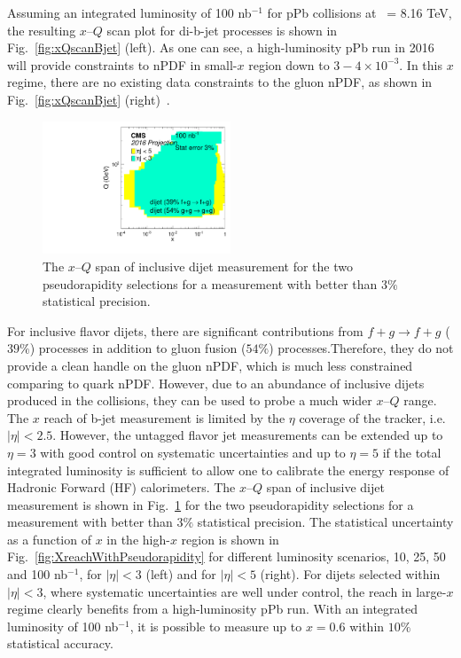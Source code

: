 Assuming an integrated luminosity of 100 nb$^{-1}$ for pPb collisions
at \rootsNN\ = 8.16 TeV, the resulting $x$--$Q$ scan plot for di-b-jet processes 
is shown in Fig.~\ref{fig:xQscanBjet} (left). As one can see, a high-luminosity
pPb run in 2016 will provide constraints to nPDF in small-$x$ region down to
$3-4 \times 10^{-3}$. In this $x$ regime, there are no existing data
constraints to the gluon nPDF, as shown in Fig.~\ref{fig:xQscanBjet} (right)~\cite{Paukkunen:2014nqa}.

\begin{figure}[h]
\begin{center}
\includegraphics[width= 0.5\textwidth]{figures/filledQX_Lumi100_InclusiveJet_etaComparison.pdf}
\caption{The $x$--$Q$ span of inclusive dijet measurement for the two pseudorapidity selections 
for a measurement with better than $3\%$ statistical precision. }
\label{fig:xQscanInclusive}
\end{center}
\end{figure}


For inclusive flavor dijets, there are significant contributions
from $f + g \rightarrow f + g$ ($39 \%$) processes in addition to gluon fusion 
($54 \%$) processes.Therefore, they do not provide a clean handle on 
the gluon nPDF, which is much less constrained comparing to quark nPDF.
However, due to an abundance of inclusive dijets produced in the collisions,
they can be used to probe a much wider $x$--$Q$ range. The $x$ reach of b-jet measurement 
is limited by the $\eta$ coverage of the tracker, i.e. $|\eta| < 2.5$. 
However, the untagged flavor jet measurements can be extended up to 
$\eta = 3$ with good control on systematic uncertainties and up to $\eta = 5$ if the total 
integrated luminosity is sufficient to allow one to calibrate the energy response of 
Hadronic Forward (HF) calorimeters. The $x$--$Q$ span of inclusive dijet 
measurement is shown in Fig.~\ref{fig:xQscanInclusive} for the two pseudorapidity selections 
for a measurement with better than $3\%$ statistical precision. 
The statistical uncertainty as a function of $x$ in the high-$x$ region 
is shown in Fig.~\ref{fig:XreachWithPseudorapidity} for different 
luminosity scenarios, 10, 25, 50 and 100 nb$^{-1}$, for $|\eta| < 3$ (left) 
and for $|\eta| < 5$ (right). For dijets selected 
within $|\eta| < 3$, where systematic uncertainties are well under control, 
the reach in large-$x$ regime clearly benefits from a high-luminosity pPb run. 
With an integrated luminosity of 100 nb$^{-1}$, it is possible to measure up to $x = 0.6$ 
within $10 \%$ statistical accuracy.

